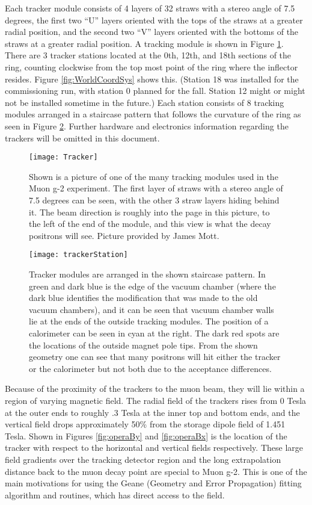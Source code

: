   Each tracker module consists of 4 layers of 32 straws with a stereo angle of 7.5 degrees, the first two ``U'' layers oriented with the tops of the straws at a greater radial position, and the second two ``V'' layers oriented with the bottoms of the straws at a greater radial position. A tracking module is shown in Figure \ref{fig:tracker}. There are 3 tracker stations located at the 0th, 12th, and 18th sections of the ring, counting clockwise from the top most point of the ring where the inflector resides. Figure \ref{fig:WorldCoordSys} shows this. (Station 18 was installed for the commissioning run, with station 0 planned for the fall. Station 12 might or might not be installed sometime in the future.) Each station consists of 8 tracking modules arranged in a staircase pattern that follows the curvature of the ring as seen in Figure \ref{fig:staircase}. Further hardware and electronics information regarding the trackers will be omitted in this document.

\begin{figure}[]
\caption{Shown is a picture of one of the many tracking modules used in the Muon g-2 experiment. The first layer of straws with a stereo angle of 7.5 degrees can be seen, with the other 3 straw layers hiding behind it. The beam direction is roughly into the page in this picture, to the left of the end of the module, and this view is what the decay positrons will see. Picture provided by James Mott.}
\centering
\texttt{[image: Tracker]}
\label{fig:tracker}
\end{figure}

\begin{figure}[]
\caption{Tracker modules are arranged in the shown staircase pattern. In green and dark blue is the edge of the vacuum chamber (where the dark blue identifies the modification that was made to the old vacuum chambers), and it can be seen that vacuum chamber walls lie at the ends of the outside tracking modules. The position of a calorimeter can be seen in cyan at the right. The dark red spots are the locations of the outside magnet pole tips. From the shown geometry one can see that many positrons will hit either the tracker or the calorimeter but not both due to the acceptance differences.}
\centering
\texttt{[image: trackerStation]}
\label{fig:staircase}
\end{figure}


  Because of the proximity of the trackers to the muon beam, they will lie within a region of varying magnetic field. The radial field of the trackers rises from 0 Tesla at the outer ends to roughly .3 Tesla at the inner top and bottom ends, and the vertical field drops approximately 50\% from the storage dipole field of 1.451 Tesla. Shown in Figures \ref{fig:operaBy} and \ref{fig:operaBx} is the location of the tracker with respect to the horizontal and vertical fields respectively. These large field gradients over the tracking detector region and the long extrapolation distance back to the muon decay point are special to Muon g-2. This is one of the main motivations for using the Geane (Geometry and Error Propagation) fitting algorithm and routines, which has direct access to the field. 


